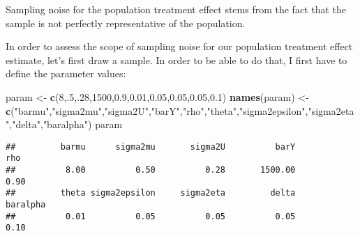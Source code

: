 \documentclass[]{book}
\newenvironment{Shaded}{\begin{snugshade}}{\end{snugshade}}
\newcommand{\KeywordTok}[1]{\textcolor[rgb]{0.13,0.29,0.53}{\textbf{#1}}}
\newcommand{\DecValTok}[1]{\textcolor[rgb]{0.00,0.00,0.81}{#1}}
\newcommand{\FloatTok}[1]{\textcolor[rgb]{0.00,0.00,0.81}{#1}}
\newcommand{\StringTok}[1]{\textcolor[rgb]{0.31,0.60,0.02}{#1}}
\newcommand{\NormalTok}[1]{#1}
\theoremstyle{definition}
\theoremstyle{definition}
\theoremstyle{definition}
\theoremstyle{remark}
\let\BeginKnitrBlock\begin \let\EndKnitrBlock\end
\begin{document}
Sampling noise for the population treatment effect stems from the fact
that the sample is not perfectly representative of the population.

\BeginKnitrBlock{example}
\protect\hypertarget{exm:unnamed-chunk-33}{}{\label{exm:unnamed-chunk-33}
}In order to assess the scope of sampling noise for our population
treatment effect estimate, let's first draw a sample. In order to be
able to do that, I first have to define the parameter values:
\EndKnitrBlock{example}

\begin{Shaded}
\begin{Highlighting}[]
\NormalTok{param <-}\StringTok{ }\KeywordTok{c}\NormalTok{(}\DecValTok{8}\NormalTok{,.}\DecValTok{5}\NormalTok{,.}\DecValTok{28}\NormalTok{,}\DecValTok{1500}\NormalTok{,}\FloatTok{0.9}\NormalTok{,}\FloatTok{0.01}\NormalTok{,}\FloatTok{0.05}\NormalTok{,}\FloatTok{0.05}\NormalTok{,}\FloatTok{0.05}\NormalTok{,}\FloatTok{0.1}\NormalTok{)}
\KeywordTok{names}\NormalTok{(param) <-}\StringTok{ }\KeywordTok{c}\NormalTok{(}\StringTok{"barmu"}\NormalTok{,}\StringTok{"sigma2mu"}\NormalTok{,}\StringTok{"sigma2U"}\NormalTok{,}\StringTok{"barY"}\NormalTok{,}\StringTok{"rho"}\NormalTok{,}\StringTok{"theta"}\NormalTok{,}\StringTok{"sigma2epsilon"}\NormalTok{,}\StringTok{"sigma2eta"}\NormalTok{,}\StringTok{"delta"}\NormalTok{,}\StringTok{"baralpha"}\NormalTok{)}
\NormalTok{param}
\end{Highlighting}
\end{Shaded}

\begin{verbatim}
##         barmu      sigma2mu       sigma2U          barY           rho 
##          8.00          0.50          0.28       1500.00          0.90 
##         theta sigma2epsilon     sigma2eta         delta      baralpha 
##          0.01          0.05          0.05          0.05          0.10
\end{verbatim}
\end{document}
